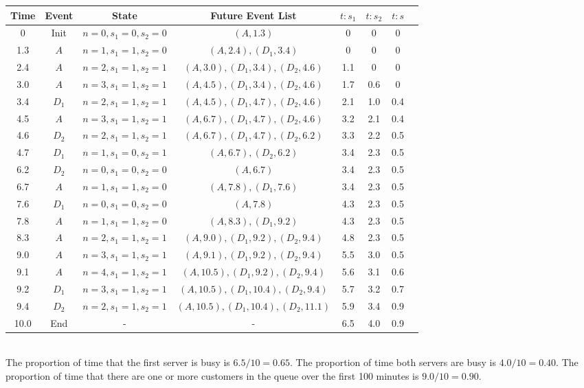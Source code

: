 \documentclass{article}
\begin{document}
\begin{enumerate}
\begin{enumerate}
\begin{tabular}{|c|c|c|c|c|c|c|c|}
\hline
Time & Event & State & Future Event List & $t:s_1$ & $t:s_2$ & $t:s$\\
\hline
0 & Init & $n=0, s_1=0, s_2=0$ & $(A, 1.3)$ & 0 & 0 & 0\\
1.3 & $A$ & $n=1, s_1=1, s_2=0$ & $(A, 2.4), (D_1, 3.4)$ & 0 & 0 & 0\\
2.4 & $A$ & $n=2, s_1=1, s_2=1$ & $(A, 3.0), (D_1, 3.4), (D_2, 4.6)$ & 1.1 & 0 & 0\\
3.0 & $A$ & $n=3, s_1=1, s_2=1$ & $(A, 4.5), (D_1, 3.4), (D_2, 4.6)$ & 1.7 & 0.6 & 0\\
3.4 & $D_1$ & $n=2, s_1=1, s_2=1$ & $(A, 4.5), (D_1, 4.7), (D_2, 4.6)$ & 2.1 & 1.0 & 0.4\\
4.5 & $A$ & $n=3, s_1=1, s_2=1$ & $(A, 6.7), (D_1, 4.7), (D_2, 4.6)$ & 3.2 & 2.1 & 0.4\\
4.6 & $D_2$ & $n=2, s_1=1, s_2=1$ & $(A, 6.7), (D_1, 4.7), (D_2, 6.2)$ & 3.3 & 2.2 & 0.5\\
4.7 & $D_1$ & $n=1, s_1=0, s_2=1$ & $(A, 6.7), (D_2, 6.2)$ & 3.4 & 2.3 & 0.5\\
6.2 & $D_2$ & $n=0, s_1=0, s_2=0$ & $(A, 6.7)$ & 3.4 & 2.3 & 0.5\\
6.7 & $A$ & $n=1, s_1=1, s_2=0$ & $(A, 7.8), (D_1, 7.6)$ & 3.4 & 2.3 & 0.5\\
7.6 & $D_1$ & $n=0, s_1=0, s_2=0$ & $(A, 7.8)$ & 4.3 & 2.3 & 0.5\\
7.8 & $A$ & $n=1, s_1=1, s_2=0$ & $(A, 8.3), (D_1, 9.2)$ & 4.3 & 2.3 & 0.5\\
8.3 & $A$ & $n=2, s_1=1, s_2=1$ & $(A, 9.0), (D_1, 9.2), (D_2, 9.4)$ & 4.8 & 2.3 & 0.5\\
9.0 & $A$ & $n=3, s_1=1, s_2=1$ & $(A, 9.1), (D_1, 9.2), (D_2, 9.4)$ & 5.5 & 3.0 & 0.5\\
9.1 & $A$ & $n=4, s_1=1, s_2=1$ & $(A, 10.5), (D_1, 9.2), (D_2, 9.4)$ & 5.6 & 3.1 & 0.6\\
9.2 & $D_1$ & $n=3, s_1=1, s_2=1$ & $(A, 10.5), (D_1, 10.4), (D_2, 9.4)$ & 5.7 & 3.2 & 0.7\\
9.4 & $D_2$ & $n=2, s_1=1, s_2=1$ & $(A, 10.5), (D_1, 10.4), (D_2, 11.1)$ & 5.9 & 3.4 & 0.9\\
10.0 & End & - & - & 6.5 & 4.0 & 0.9\\
\hline
\end{tabular}\\

The proportion of time that the first server is busy is $6.5/10 = 0.65$.
The proportion of time both servers are busy is $4.0/10 = 0.40$.
The proportion of time that there are one or more customers in the queue over the first 100 minutes is $9.0/10 = 0.90$.\\


\end{enumerate}
\end{enumerate}
\end{document}
